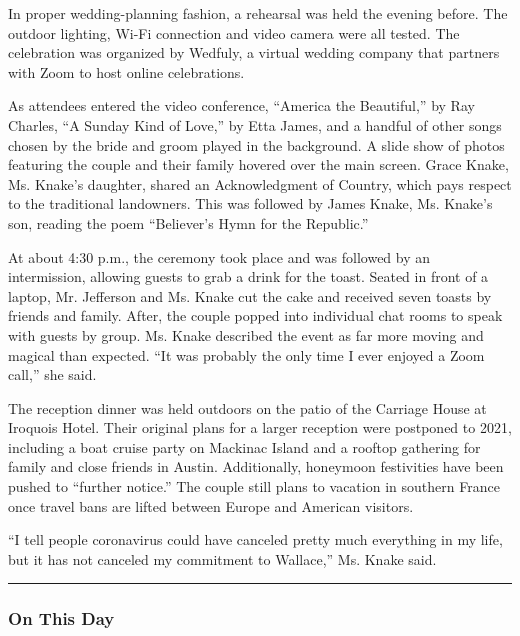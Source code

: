 In proper wedding-planning fashion, a rehearsal was held the evening
before. The outdoor lighting, Wi-Fi connection and video camera were all
tested. The celebration was organized by Wedfuly, a virtual wedding
company that partners with Zoom to host online celebrations.

As attendees entered the video conference, ``America the Beautiful,'' by
Ray Charles, ``A Sunday Kind of Love,'' by Etta James, and a handful of
other songs chosen by the bride and groom played in the background. A
slide show of photos featuring the couple and their family hovered over
the main screen. Grace Knake, Ms. Knake's daughter, shared an
Acknowledgment of Country, which pays respect to the traditional
landowners. This was followed by James Knake, Ms. Knake's son, reading
the poem ``Believer's Hymn for the Republic.''

At about 4:30 p.m., the ceremony took place and was followed by an
intermission, allowing guests to grab a drink for the toast. Seated in
front of a laptop, Mr. Jefferson and Ms. Knake cut the cake and received
seven toasts by friends and family. After, the couple popped into
individual chat rooms to speak with guests by group. Ms. Knake described
the event as far more moving and magical than expected. ``It was
probably the only time I ever enjoyed a Zoom call,'' she said.

The reception dinner was held outdoors on the patio of the Carriage
House at Iroquois Hotel. Their original plans for a larger reception
were postponed to 2021, including a boat cruise party on Mackinac Island
and a rooftop gathering for family and close friends in Austin.
Additionally, honeymoon festivities have been pushed to ``further
notice.'' The couple still plans to vacation in southern France once
travel bans are lifted between Europe and American visitors.

``I tell people coronavirus could have canceled pretty much everything
in my life, but it has not canceled my commitment to Wallace,'' Ms.
Knake said.

\begin{center}\rule{0.5\linewidth}{\linethickness}\end{center}

\hypertarget{on-this-day}{%
\subsubsection{\texorpdfstring{\textbf{On This
Day}}{On This Day}}\label{on-this-day}}

